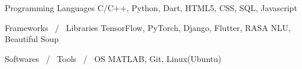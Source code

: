

\begin{cvskills}

  \cvskill
    {Programming Languages} %
    {C/C++, Python, Dart, HTML5, CSS, SQL, Javascript} %


  \cvskill
    {Frameworks \, / \, Libraries} %
    {TensorFlow, PyTorch, Django, Flutter, RASA NLU, Beautiful Soup} %

\cvskill
    {Softwares \, / \, Tools \, / \, OS} %
    {MATLAB, Git, Linux(Ubuntu)} %

\end{cvskills}

